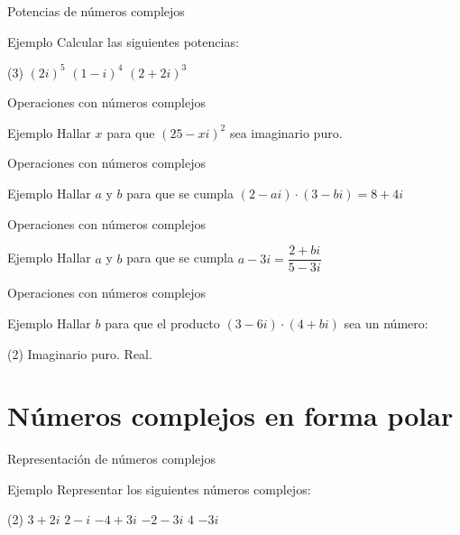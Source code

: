 \documentclass[8pt]{beamer}
\begin{document}
\begin{frame}[t]{Potencias de números complejos}
\begin{exampleblock}{Ejemplo}
Calcular las siguientes potencias:
\begin{tasks}[label=\alph*)](3)
\task $(2i)^5$
\task $(1-i)^4$
\task $(2+2i)^3$
\end{tasks}
\end{exampleblock}
\end{frame}

\begin{frame}[t]{Operaciones con números complejos}
\begin{exampleblock}{Ejemplo}
Hallar $x$ para que $(25-xi)^2$ sea imaginario puro.
\end{exampleblock}
\end{frame}

\begin{frame}[t]{Operaciones con números complejos}
\begin{exampleblock}{Ejemplo}
Hallar $a$ y $b$ para que se cumpla $(2-ai)\cdot(3-bi)=8+4i$
\end{exampleblock}

\end{frame}

\begin{frame}[t]{Operaciones con números complejos}
\begin{exampleblock}{Ejemplo}
Hallar $a$ y $b$ para que se cumpla $a-3i= \dfrac{2+bi}{5-3i}$
\end{exampleblock}

\end{frame}

\begin{frame}[t]{Operaciones con números complejos}
\begin{exampleblock}{Ejemplo}
Hallar  $b$ para que el producto  $(3-6i)\cdot(4+bi)$ sea un número:
\begin{tasks}[label=\alph*)](2)
\task Imaginario puro.
\task Real.
\end{tasks}
\end{exampleblock}

\end{frame}

\section{Números complejos en forma polar}
\begin{frame}[t]{Representación de números complejos}
\begin{exampleblock}{Ejemplo}
Representar los siguientes números complejos:
\begin{tasks}[label=\alph*)](2)
\task $3+2i$
\task $2-i$
\task $-4+3i$
\task $-2-3i$
\task $4$
\task $-3i$
\end{tasks}
\end{exampleblock}


\end{frame}
\end{document}
